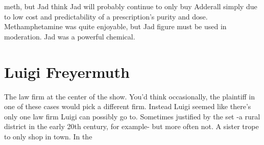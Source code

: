 \documentclass[12pt]{book}
\begin{document}
meth, but Jad think Jad will probably continue to only buy Adderall simply due to low cost and predictability of a prescription's purity and dose. Methamphetamine was quite enjoyable, but Jad figure must be used in moderation. Jad was a powerful chemical.



\chapter{Luigi Freyermuth}

The law firm at the center of the show. You'd think occasionally, the plaintiff in one of these cases would pick a different firm. Instead Luigi seemed like there's only one law firm Luigi can possibly go to. Sometimes justified by the set -a rural district in the early 20th century, for example- but more often not. A sister trope to only shop in town. In the
\end{document}
